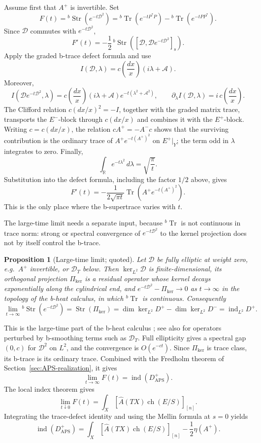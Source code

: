 \documentclass[12pt,oneside,reqno]{article}
\DeclareMathOperator{\Tr}{Tr}
\DeclareMathOperator{\Str}{Str}
\theoremstyle{plain}
\newtheorem{proposition}[theorem]{Proposition}
\theoremstyle{definition}
\theoremstyle{remark}
\begin{document}
Assume first that \(A^+\) is invertible. Set
\[
 F(t)={}^b\Str(e^{-t\mathcal D^2})
 ={}^b\Tr(e^{-tP^*P})-{}^b\Tr(e^{-tPP^*}).
\]
Since \(\mathcal D\) commutes with \(e^{-t\mathcal D^2}\),
\[
 F'(t)
 =
 -\frac12\,{}^b\Str
 \left([\mathcal D,\mathcal D e^{-t\mathcal D^2}]_{\mathrm s}\right).
\]
Apply the graded b-trace defect formula and use
\[
 I(\mathcal D,\lambda)
 =
 c\!\left(\frac{dx}{x}\right)(i\lambda+\mathcal A).
\]
Moreover,
\[
 I(\mathcal D e^{-t\mathcal D^2},\lambda)
 =
 c\!\left(\frac{dx}{x}\right)(i\lambda+\mathcal A)
 e^{-t(\lambda^2+\mathcal A^2)},
 \qquad
 \partial_\lambda I(\mathcal D,\lambda)
 =i\,c\!\left(\frac{dx}{x}\right).
\]
The Clifford relation \(c(dx/x)^2=-I\), together with the graded matrix
trace, transports the \(E^-\)-block through \(c(dx/x)\) and combines it
with the \(E^+\)-block. Writing \(c=c(dx/x)\), the relation
\(cA^+=-A^-c\) shows that the surviving contribution is the ordinary trace of
\(A^+e^{-t(A^+)^2}\) on \(E^+|_Y\); the term odd in \(\lambda\) integrates
to zero. Finally,
\[
 \int_{\mathbb R}e^{-t\lambda^2}\,d\lambda
 =\sqrt{\frac{\pi}{t}}.
\]
Substitution into the defect formula, including the factor \(1/2\) above,
gives
\[
 F'(t)
 =
 -\frac1{2\sqrt{\pi t}}\Tr(A^+e^{-t(A^+)^2}).
\]
This is the only place where the b-supertrace varies with \(t\).

The large-time limit needs a separate input, because \({}^b\Tr\) is not
continuous in trace norm: strong or spectral convergence of
\(e^{-t\mathcal D^2}\) to the kernel projection does not by itself control
the b-trace.

\begin{proposition}[Large-time limit; quoted]\label{prop:large-time}
Let \(\mathcal D\) be fully elliptic at weight zero, e.g.\ \(A^+\)
invertible, or \(\mathcal D_T\) below. Then \(\ker_{L^2}\mathcal D\) is
finite-dimensional, its orthogonal projection \(\Pi_{\ker}\) is a
residual operator whose kernel decays exponentially along the
cylindrical end, and \(e^{-t\mathcal D^2}-\Pi_{\ker}\to0\) as \(t\to\infty\)
in the topology of the b-heat calculus, in which \({}^b\Tr\) is continuous.
Consequently
\[
 \lim_{t\to\infty}{}^b\Str(e^{-t\mathcal D^2})
 =\Str(\Pi_{\ker})
 =\dim\ker_{L^2}D^+-\dim\ker_{L^2}D^-
 =\operatorname{ind}_{L^2}D^+ .
\]
\end{proposition}

This is the large-time part of the b-heat calculus
\cite[Chapter~7]{Melrose}; see also \cite{MelrosePiazza} for operators
perturbed by b-smoothing terms such as \(\mathcal D_T\). Full ellipticity
gives a spectral gap \((0,c)\) for \(\mathcal D^2\) on \(L^2\), and the
convergence is \(O(e^{-ct})\). Since \(\Pi_{\ker}\) is trace class, its
b-trace is its ordinary trace. Combined with the Fredholm theorem of
Section~\ref{sec:APS-realization}, it gives
\[
 \lim_{t\to\infty}F(t)=\operatorname{ind}(D^+_{\mathrm{APS}}).
\]
The local index theorem gives
\[
 \lim_{t\downarrow0}F(t)
 =
 \int_X
 \left[
 \widehat A(TX)\operatorname{ch}(E/S)
 \right]_{[n]}.
\]
Integrating the trace-defect identity and using the Mellin formula at
\(s=0\) yields
\[
 \operatorname{ind}(D^+_{\mathrm{APS}})
 =
 \int_X
 \left[
 \widehat A(TX)\operatorname{ch}(E/S)
 \right]_{[n]}
 -\frac12\eta(A^+).
\]
\end{document}
